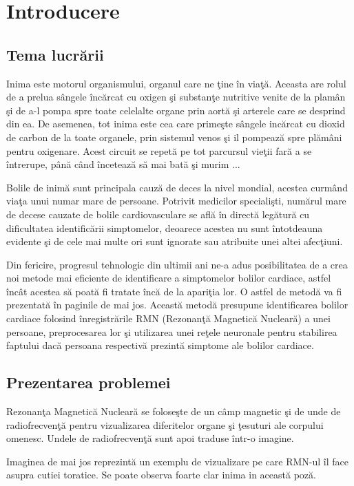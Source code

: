 \chapter{Introducere}

\section{Tema lucr\u{a}rii}

Inima este motorul organismului, organul care ne \c{t}ine \^{i}n via\c{t}\u{a}. Aceasta are rolul de a prelua s\^{a}ngele \^{i}nc\u{a}rcat cu oxigen \c{s}i substan\c{t}e nutritive venite de la plam\^{a}n \c{s}i de a-l pompa spre toate celelalte organe prin aort\u{a} \c{s}i arterele care se desprind din ea. De asemenea, tot inima este cea care prime\c{s}te s\^{a}ngele inc\u{a}rcat cu dioxid de carbon de la toate organele, prin sistemul venos \c{s}i il pompeaz\u{a} spre pl\u{a}m\^{a}ni pentru oxigenare. Acest circuit se repet\u{a} pe tot parcursul vie\c{t}ii far\u{a} a se \^{i}ntrerupe, p\^{a}n\u{a} c\^{a}nd \^{i}nceteaz\u{a} s\u{a} mai bat\u{a} \c{s}i murim ...
\par 
Bolile de inim\u{a} sunt principala cauz\u{a} de deces la nivel mondial, acestea curm\^{a}nd via\c{t}a unui numar mare de persoane. Potrivit medicilor speciali\c{s}ti, num\u{a}rul mare de decese cauzate de bolile cardiovasculare se afl\u{a} \^{i}n direct\u{a} leg\u{a}tur\u{a} cu dificultatea identific\u{a}rii simptomelor, deoarece acestea nu sunt \^{i}ntotdeauna evidente \c{s}i de cele mai multe ori sunt ignorate sau atribuite unei altei afec\c{t}iuni.
\par 
Din fericire, progresul tehnologic din ultimii ani ne-a adus posibilitatea de a crea noi metode mai eficiente de identificare a simptomelor bolilor cardiace, astfel \^{i}nc\^{a}t acestea s\u{a} poat\u{a} fi tratate \^{i}nc\u{a} de la apari\c{t}ia lor. O astfel de metod\u{a} va fi prezentat\u{a} \^{i}n paginile de mai jos. Aceast\u{a} metod\u{a} presupune identificarea bolilor cardiace folosind \^{i}nregistr\u{a}rile RMN (Rezonan\c{t}\u{a} Magnetic\u{a} Nuclear\u{a}) a unei persoane, preprocesarea lor \c{s}i utilizarea unei re\c{t}ele neuronale pentru stabilirea faptului dac\u{a} persoana respectiv\u{a} prezint\u{a} simptome ale bolilor cardiace.

\section{Prezentarea problemei}

Rezonan\c{t}a Magnetic\u{a} Nuclear\u{a} se folose\c{s}te de un c\^{a}mp magnetic \c{s}i de unde de radiofrecven\c{t}\u{a} pentru vizualizarea diferitelor organe \c{s}i \c{t}esuturi ale corpului omenesc. Undele de radiofrecven\c{t}\u{a} sunt apoi traduse \^{i}ntr-o imagine.
\par
Imaginea de mai jos reprezint\u{a} un exemplu de vizualizare pe care RMN-ul \^{i}l face asupra cutiei toratice. Se poate observa foarte clar inima in aceast\u{a} poz\u{a}.

